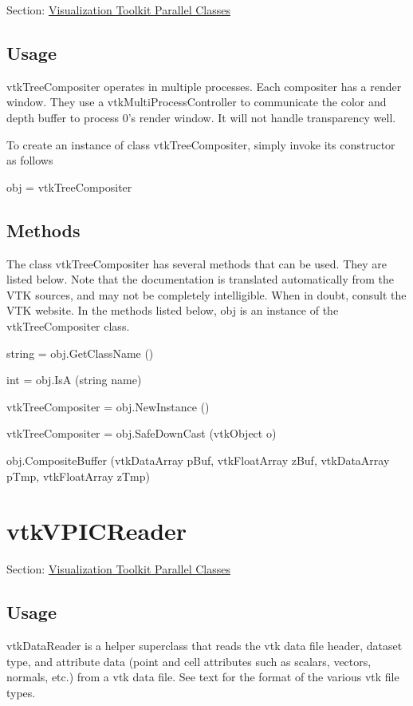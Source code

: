 Section\-: \hyperlink{sec_vtkparallel}{Visualization Toolkit Parallel Classes} \hypertarget{vtkwidgets_vtkxyplotwidget_Usage}{}\subsection{Usage}\label{vtkwidgets_vtkxyplotwidget_Usage}
vtk\-Tree\-Compositer operates in multiple processes. Each compositer has a render window. They use a vtk\-Multi\-Process\-Controller to communicate the color and depth buffer to process 0's render window. It will not handle transparency well.

To create an instance of class vtk\-Tree\-Compositer, simply invoke its constructor as follows \begin{DoxyVerb}  obj = vtkTreeCompositer
\end{DoxyVerb}
 \hypertarget{vtkwidgets_vtkxyplotwidget_Methods}{}\subsection{Methods}\label{vtkwidgets_vtkxyplotwidget_Methods}
The class vtk\-Tree\-Compositer has several methods that can be used. They are listed below. Note that the documentation is translated automatically from the V\-T\-K sources, and may not be completely intelligible. When in doubt, consult the V\-T\-K website. In the methods listed below, {\ttfamily obj} is an instance of the vtk\-Tree\-Compositer class. 
\begin{DoxyItemize}
\item {\ttfamily string = obj.\-Get\-Class\-Name ()}  
\item {\ttfamily int = obj.\-Is\-A (string name)}  
\item {\ttfamily vtk\-Tree\-Compositer = obj.\-New\-Instance ()}  
\item {\ttfamily vtk\-Tree\-Compositer = obj.\-Safe\-Down\-Cast (vtk\-Object o)}  
\item {\ttfamily obj.\-Composite\-Buffer (vtk\-Data\-Array p\-Buf, vtk\-Float\-Array z\-Buf, vtk\-Data\-Array p\-Tmp, vtk\-Float\-Array z\-Tmp)}  
\end{DoxyItemize}\hypertarget{vtkparallel_vtkvpicreader}{}\section{vtk\-V\-P\-I\-C\-Reader}\label{vtkparallel_vtkvpicreader}
Section\-: \hyperlink{sec_vtkparallel}{Visualization Toolkit Parallel Classes} \hypertarget{vtkwidgets_vtkxyplotwidget_Usage}{}\subsection{Usage}\label{vtkwidgets_vtkxyplotwidget_Usage}
vtk\-Data\-Reader is a helper superclass that reads the vtk data file header, dataset type, and attribute data (point and cell attributes such as scalars, vectors, normals, etc.) from a vtk data file. See text for the format of the various vtk file types.


